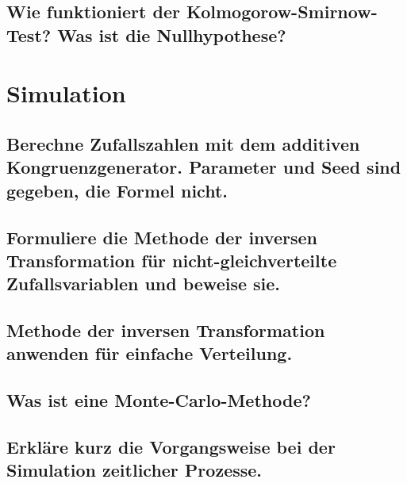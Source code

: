 \documentclass[a4paper,10pt]{article}
\begin{document}
\subsection{Wie funktioniert der Kolmogorow-Smirnow-Test? Was ist die Nullhypothese?}

\newpage
\section{Simulation}
\subsection{Berechne Zufallszahlen mit dem additiven Kongruenz\-generator. Parameter und Seed sind gegeben, die Formel nicht.}

\subsection{Formuliere die Methode der in\-versen Trans\-for\-ma\-tion für nicht-\-gleich\-ver\-teilte Zufallsvariablen und beweise sie.}

\subsection{Methode der inversen Transformation anwenden für einfache Verteilung.}

\subsection{Was ist eine Monte-Carlo-Methode?}

\subsection{Erkläre kurz die Vorgangsweise bei der Simulation zeitlicher Prozesse.}
\end{document}
